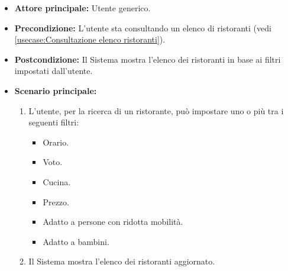 \label{usecase:Filtra ristoranti}
\begin{itemize}
	\item \textbf{Attore principale:} Utente generico.
	
	\item \textbf{Precondizione:} L'utente sta consultando un elenco di ristoranti (vedi \autoref{usecase:Consultazione elenco ristoranti}).

	\item \textbf{Postcondizione:} Il Sistema mostra l'elenco dei ristoranti in base ai filtri impostati dall'utente.
 
	      
	\item \textbf{Scenario principale:}
	      \begin{enumerate}
		      \item L'utente, per la ricerca di un ristorante, può impostare uno o più tra i seguenti filtri:
		      \begin{itemize}
                \item Orario.
                \item Voto.
                \item Cucina.
                \item Prezzo.
                \item Adatto a persone con ridotta mobilità.
                \item Adatto a bambini.
              \end{itemize}

		      \item Il Sistema mostra l'elenco dei ristoranti aggiornato.
	      \end{enumerate}

\end{itemize}